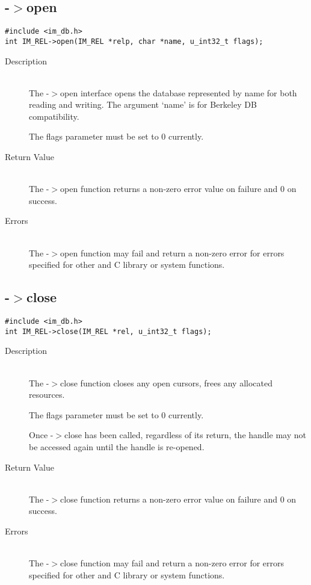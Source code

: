 \newpage
\subsection{{\IMREL}-$>$open}
\begin{verbatim}
#include <im_db.h>
int IM_REL->open(IM_REL *relp, char *name, u_int32_t flags);
\end{verbatim}
\begin{description}
\item[Description]\ \\
  The {\IMREL}-$>$open interface opens the database represented by name for
  both reading and writing. The argument `name' is for Berkeley DB
  compatibility.

  The flags parameter must be set to 0 currently.  

\item[Return Value]\ \\
  The {\IMREL}-$>$open function returns a non-zero error value on failure
  and 0 on success.
\item[Errors]\ \\
  The {\IMREL}-$>$open function may fail and return a non-zero
  error for errors specified for other {\IMDB} and C library or
  system functions.
\end{description}

\newpage
\subsection{{\IMREL}-$>$close}
\begin{verbatim}
#include <im_db.h>
int IM_REL->close(IM_REL *rel, u_int32_t flags);
\end{verbatim}
\begin{description}
\item[Description]\ \\
The {\IMREL}-$>$close function closes any open cursors, frees any
allocated resources.

The flags parameter must be set to 0 currently.  

Once {\IMREL}-$>$close has been called, regardless of its return, the
{\IMREL} handle may not be accessed again until the handle is
re-opened.
\item[Return Value]\ \\
The {\IMREL}-$>$close function returns a non-zero error value on failure
and 0 on success.
\item[Errors]\ \\
The {\IMREL}-$>$close function may fail and return a non-zero error for
errors specified for other {\IMDB} and C library or system functions.
\end{description}

